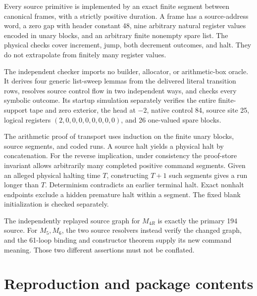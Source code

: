 \documentclass[10pt,letterpaper]{article}
\begin{document}
Every source primitive is implemented by an exact finite segment between canonical frames, with a strictly positive duration. A frame has a source-address word, a zero gap with header constant 48, nine arbitrary natural register values encoded in unary blocks, and an arbitrary finite nonempty spare list. The physical checks cover increment, jump, both decrement outcomes, and halt. They do not extrapolate from finitely many register values.

The independent checker imports no builder, allocator, or arithmetic-box oracle. It derives four generic list-sweep lemmas from the delivered literal transition rows, resolves source control flow in two independent ways, and checks every symbolic outcome. Its startup simulation separately verifies the entire finite-support tape and zero exterior, the head at $-2$, native control 84, source site 25, logical registers $(2,0,0,0,0,0,0,0,0)$, and 26 one-valued spare blocks.



The arithmetic proof of transport uses induction on the finite unary blocks, source segments, and coded runs. A source halt yields a physical halt by concatenation. For the reverse implication, under consistency the proof-store invariant allows arbitrarily many completed positive command segments. Given an alleged physical halting time $T$, constructing $T+1$ such segments gives a run longer than $T$. Determinism contradicts an earlier terminal halt. Exact nonhalt endpoints exclude a hidden premature halt within a segment. The fixed blank initialization is checked separately.

The independently replayed source graph for $M_{4R}$ is exactly the primary 194 source. For $M_5,M_6$, the two source resolvers instead verify the changed graph, and the 61-loop binding and constructor theorem supply its new command meaning. Those two different assertions must not be conflated.

\section{Reproduction and package contents}
\end{document}
